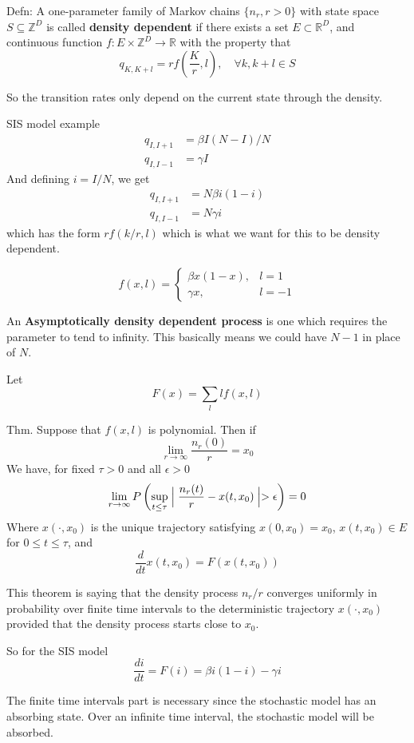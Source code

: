 \documentclass{X:/Documents/Coding/Latex/myassignment}
\begin{document}
Defn: A one-parameter family of Markov chains $\{n_r,r >0\}$ with state space $S \subseteq \mathbb{Z}^{D}$ is called \textbf{density dependent} if there exists a set $E \subset \mathbb{R}^D$, and continuous function $f : E\times \mathbb{Z}^D \to \mathbb{R}$ with the property that
\[q_{K,K+l} = r f(\frac{K}{r}, l), \quad \forall k, k+l \in S\]

So the transition rates only depend on the current state through the density. 


SIS model example
\begin{align*}
    q_{I,I+1} &= \beta I(N-I)/N\\
    q_{I,I-1} &= \gamma I
\end{align*}
And defining $i = I/N$, we get
\begin{align*}
    q_{I,I+1} &= N\beta i(1-i)\\
    q_{I,I-1} &= N \gamma i
\end{align*}
which has the form $rf(k/r, l)$ which is what we want for this to be density dependent.

\[f(x,l) = \begin{cases}
\beta x(1-x),& l=1\\
\gamma x,& l=-1
\end{cases}\]


An \textbf{Asymptotically density dependent process} is one which requires the parameter to tend to infinity. This basically means we could have $N-1$ in place of $N$.



Let 
\[F(x) = \sum_l l f(x,l)\]

Thm. Suppose that $f(x,l)$ is polynomial. Then if 
\[\lim_{r\to \infty} \frac{n_r(0)}{r} = x_0\]
We have, for fixed $\tau > 0$ and all $\epsilon >0$
\[\lim_{r\to\infty} P\left(\sup_{t\leq \tau} \Bigm|\frac{n_r(t)}{r} - x(t,x_0)\Bigm| > \epsilon \right) =0\]
Where $x(\cdot,x_0)$ is the unique trajectory satisfying $x(0,x_0) = x_0$, $x(t,x_0) \in E$ for $0\leq t \leq \tau$, and 
\[\frac{d}{dt} x(t,x_0) = F(x(t,x_0))\]

This theorem is saying that the density process $n_r/r$ converges uniformly in probability over finite time intervals to the deterministic trajectory $x(\cdot,x_0)$ provided that the density process starts close to $x_0$.


So for the SIS model
\[\frac{di}{dt} = F(i) = \beta i(1-i) - \gamma i\]

The finite time intervals part is necessary since the stochastic model has an absorbing state. Over an infinite time interval, the stochastic model will be absorbed.
\end{document}
